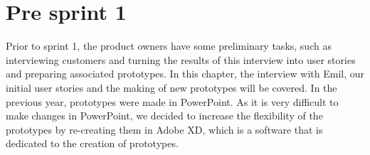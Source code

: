 \chapter{Pre sprint 1}
Prior to sprint 1, the product owners have some preliminary tasks, such as interviewing customers and turning the results of this interview into user stories and preparing associated prototypes.
In this chapter, the interview with Emil, our initial user stories and the making of new prototypes will be covered.
In the previous year, prototypes were made in PowerPoint.
As it is very difficult to make changes in PowerPoint, we decided to increase the flexibility of the prototypes by re-creating them in Adobe XD, which is a software that is dedicated to the creation of prototypes.




